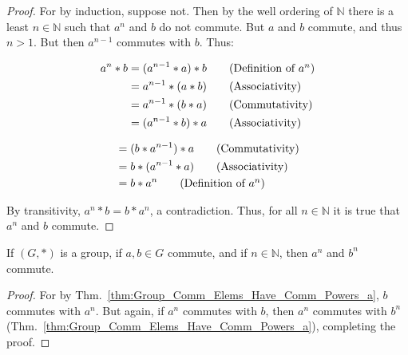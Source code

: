     \begin{proof}
        For by induction, suppose not. Then by the well ordering of $\mathbb{N}$
        there is a least $n\in\mathbb{N}$ such that $a^{n}$ and $b$ do not
        commute. But $a$ and $b$ commute, and thus $n>1$. But then $a^{n-1}$
        commutes with $b$. Thus:
        \par
        \begin{minipage}[t]{0.52\textwidth}
            \centering
            \begin{align}
                a^{n}*b&=(a^{n-1}*a)*b
                \tag{Definition of $a^{n}$}\\
                &=a^{n-1}*(a*b)
                \tag{Associativity}\\
                &=a^{n-1}*(b*a)
                \tag{Commutativity}\\
                &=(a^{n-1}*b)*a
                \tag{Associativity}
            \end{align}
            \hfill
        \end{minipage}
        \begin{minipage}[t]{0.47\textwidth}
            \centering
            \begin{align}
                &=(b*a^{n-1})*a
                \tag{Commutativity}\\
                &=b*(a^{n-1}*a)
                \tag{Associativity}\\
                &=b*a^{n}
                \tag{Definition of $a^{n}$}
            \end{align}
        \end{minipage}
        \par\vspace{2.5ex}
        By transitivity, $a^{n}*b=b*a^{n}$, a contradiction. Thus, for all
        $n\in\mathbb{N}$ it is true that $a^{n}$ and $b$ commute.
    \end{proof}
    \begin{theorem}
        \label{thm:Group_Commuting_Elements_Have_Commuting_Powers_Part_b}%
        If $(G,*)$ is a group, if $a,b\in{G}$ commute, and if $n\in\mathbb{N}$,
        then $a^{n}$ and $b^{n}$ commute.
    \end{theorem}
    \begin{proof}
        For by Thm.~\ref{thm:Group_Comm_Elems_Have_Comm_Powers_a},
        $b$ commutes with $a^{n}$. But again, if $a^{n}$ commutes with
        $b$, then $a^{n}$ commutes with $b^{n}$
        (Thm.~\ref{thm:Group_Comm_Elems_Have_Comm_Powers_a}), completing the
        proof.
    \end{proof}
